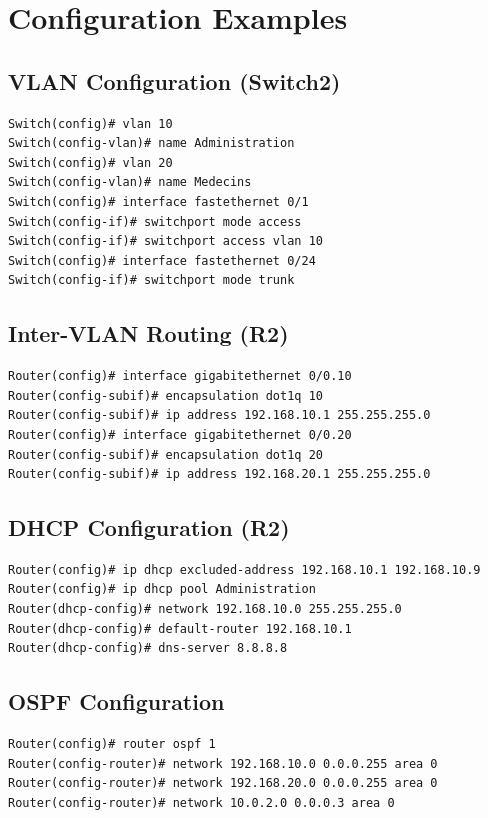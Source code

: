 \documentclass[12pt, a4paper]{article}
\begin{document}
\section{Configuration Examples}

\subsection{VLAN Configuration (Switch2)}
\begin{lstlisting}
Switch(config)# vlan 10
Switch(config-vlan)# name Administration
Switch(config)# vlan 20
Switch(config-vlan)# name Medecins
Switch(config)# interface fastethernet 0/1
Switch(config-if)# switchport mode access
Switch(config-if)# switchport access vlan 10
Switch(config)# interface fastethernet 0/24
Switch(config-if)# switchport mode trunk
\end{lstlisting}

\subsection{Inter-VLAN Routing (R2)}
\begin{lstlisting}
Router(config)# interface gigabitethernet 0/0.10
Router(config-subif)# encapsulation dot1q 10
Router(config-subif)# ip address 192.168.10.1 255.255.255.0
Router(config)# interface gigabitethernet 0/0.20
Router(config-subif)# encapsulation dot1q 20
Router(config-subif)# ip address 192.168.20.1 255.255.255.0
\end{lstlisting}

\subsection{DHCP Configuration (R2)}
\begin{lstlisting}
Router(config)# ip dhcp excluded-address 192.168.10.1 192.168.10.9
Router(config)# ip dhcp pool Administration
Router(dhcp-config)# network 192.168.10.0 255.255.255.0
Router(dhcp-config)# default-router 192.168.10.1
Router(dhcp-config)# dns-server 8.8.8.8
\end{lstlisting}

\subsection{OSPF Configuration}
\begin{lstlisting}
Router(config)# router ospf 1
Router(config-router)# network 192.168.10.0 0.0.0.255 area 0
Router(config-router)# network 192.168.20.0 0.0.0.255 area 0
Router(config-router)# network 10.0.2.0 0.0.0.3 area 0
\end{lstlisting}
\end{document}
